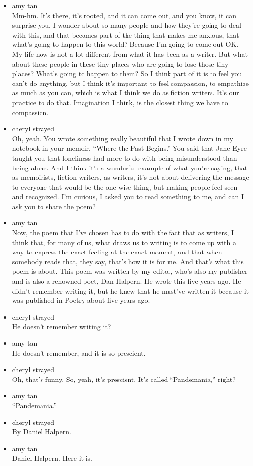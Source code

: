 \begin{itemize}
\item
  amy tan\\
  Mm-hm. It's there, it's rooted, and it can come out, and you know, it
  can surprise you. I wonder about so many people and how they're going
  to deal with this, and that becomes part of the thing that makes me
  anxious, that what's going to happen to this world? Because I'm going
  to come out OK. My life now is not a lot different from what it has
  been as a writer. But what about these people in these tiny places who
  are going to lose those tiny places? What's going to happen to them?
  So I think part of it is to feel you can't do anything, but I think
  it's important to feel compassion, to empathize as much as you can,
  which is what I think we do as fiction writers. It's our practice to
  do that. Imagination I think, is the closest thing we have to
  compassion.
\item
  cheryl strayed\\
  Oh, yeah. You wrote something really beautiful that I wrote down in my
  notebook in your memoir, ``Where the Past Begins.'' You said that Jane
  Eyre taught you that loneliness had more to do with being
  misunderstood than being alone. And I think it's a wonderful example
  of what you're saying, that as memoirists, fiction writers, as
  writers, it's not about delivering the message to everyone that would
  be the one wise thing, but making people feel seen and recognized. I'm
  curious, I asked you to read something to me, and can I ask you to
  share the poem?
\item
  amy tan\\
  Now, the poem that I've chosen has to do with the fact that as
  writers, I think that, for many of us, what draws us to writing is to
  come up with a way to express the exact feeling at the exact moment,
  and that when somebody reads that, they say, that's how it is for me.
  And that's what this poem is about. This poem was written by my
  editor, who's also my publisher and is also a renowned poet, Dan
  Halpern. He wrote this five years ago. He didn't remember writing it,
  but he knew that he must've written it because it was published in
  Poetry about five years ago.
\item
  cheryl strayed\\
  He doesn't remember writing it?
\item
  amy tan\\
  He doesn't remember, and it is so prescient.
\item
  cheryl strayed\\
  Oh, that's funny. So, yeah, it's prescient. It's called
  ``Pandemania,'' right?
\item
  amy tan\\
  ``Pandemania.''
\item
  cheryl strayed\\
  By Daniel Halpern.
\item
  amy tan\\
  Daniel Halpern. Here it is.


\end{itemize}
